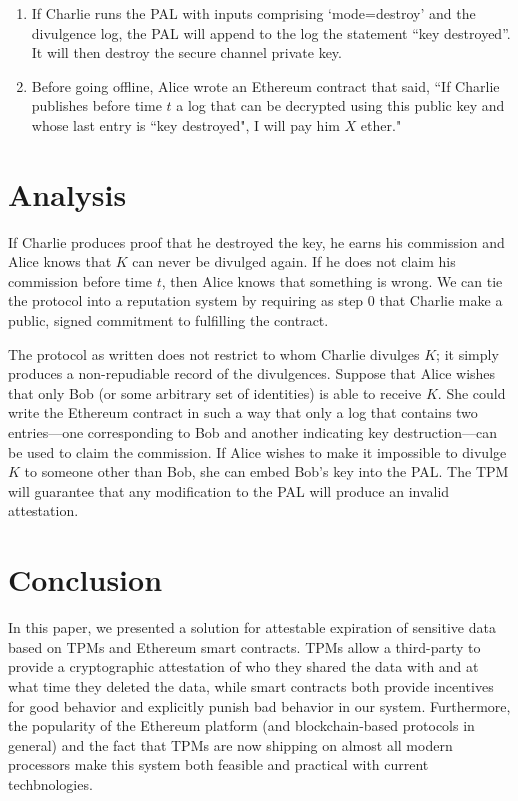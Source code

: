 \documentclass{article}
\begin{document}
\begin{enumerate}
\item If Charlie runs the PAL with inputs comprising `mode=destroy' and the divulgence log, the PAL will append to the log the statement ``key destroyed''. It will then destroy the secure channel private key.

\item Before going offline, Alice wrote an Ethereum contract that said, ``If Charlie publishes before time $t$ a log that can be decrypted using this public key and whose last entry is ``key destroyed", I will pay him $X$ ether."

\end{enumerate}

\section{Analysis}

If Charlie produces proof that he destroyed the key, he earns his commission and Alice knows that $K$ can never be divulged again. If he does not claim his commission before time $t$, then Alice knows that something is wrong. We can tie the protocol into a reputation system by requiring as step 0 that Charlie make a public, signed commitment to fulfilling the contract.

The protocol as written does not restrict to whom Charlie divulges $K$; it simply produces a non-repudiable record of the divulgences. Suppose that Alice wishes that only Bob (or some arbitrary set of identities) is able to receive $K$. She could write the Ethereum contract in such a way that only a log that contains two entries---one corresponding to Bob and another indicating key destruction---can be used to claim the commission. If Alice wishes to make it impossible to divulge $K$ to someone other than Bob, she can embed Bob's key into the PAL. The TPM will guarantee that any modification to the PAL will produce an invalid attestation.

\section{Conclusion}

In this paper, we presented a solution for attestable expiration of sensitive data based on TPMs and Ethereum smart contracts. TPMs allow a third-party to provide a cryptographic attestation of who they shared the data with and at what time they deleted the data, while smart contracts both provide incentives for good behavior and explicitly punish bad behavior in our system. Furthermore, the popularity of the Ethereum platform (and blockchain-based protocols in general) and the fact that TPMs are now shipping on almost all modern processors make this system both feasible and practical with current techbnologies.



\end{document}
